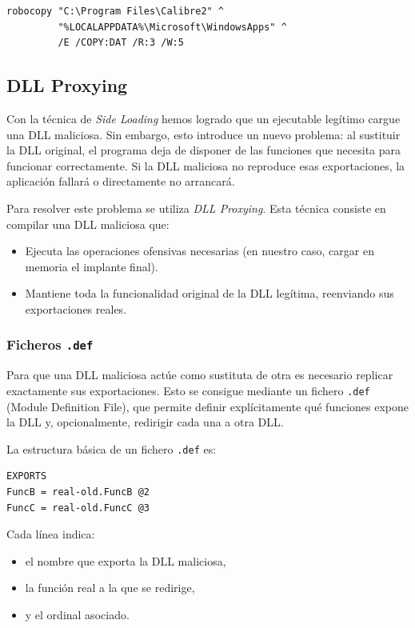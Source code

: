 \begin{verbatim}
robocopy "C:\Program Files\Calibre2" ^
         "%LOCALAPPDATA%\Microsoft\WindowsApps" ^
         /E /COPY:DAT /R:3 /W:5
\end{verbatim}


\subsection{DLL Proxying}

Con la técnica de \textit{Side Loading} hemos logrado que un ejecutable legítimo cargue una DLL maliciosa. Sin embargo, esto introduce un nuevo problema: al sustituir la DLL original, el programa deja de disponer de las funciones que necesita para funcionar correctamente. Si la DLL maliciosa no reproduce esas exportaciones, la aplicación fallará o directamente no arrancará.

Para resolver este problema se utiliza \textit{DLL Proxying}. Esta técnica consiste en compilar una DLL maliciosa que:

\begin{itemize}
\item Ejecuta las operaciones ofensivas necesarias (en nuestro caso, cargar en memoria el implante final).
\item Mantiene toda la funcionalidad original de la DLL legítima, reenviando sus exportaciones reales.
\end{itemize}

\subsubsection*{Ficheros \texttt{.def}}

Para que una DLL maliciosa actúe como sustituta de otra es necesario replicar exactamente sus exportaciones. Esto se consigue mediante un fichero \texttt{.def} (Module Definition File), que permite definir explícitamente qué funciones expone la DLL y, opcionalmente, redirigir cada una a otra DLL.

La estructura básica de un fichero \texttt{.def} es:

\begin{verbatim}
EXPORTS
FuncB = real-old.FuncB @2
FuncC = real-old.FuncC @3
\end{verbatim}

Cada línea indica:

\begin{itemize}
\item el nombre que exporta la DLL maliciosa,
\item la función real a la que se redirige,
\item y el ordinal asociado.
\end{itemize}

